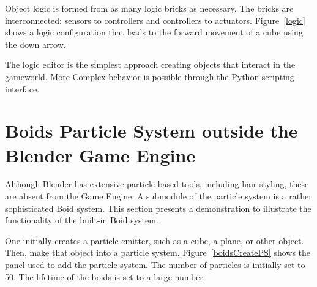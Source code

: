 Object logic is formed from as many logic bricks as necessary. The bricks are interconnected: sensors to controllers and controllers to actuators. 
Figure~\ref{logic} shows a logic configuration that leads to the forward movement of a cube using the down arrow.

The logic editor is the simplest approach creating objects that interact
in the gameworld. 
More Complex behavior is possible through the Python scripting interface.

\section{Boids Particle System outside the Blender Game Engine}
Although Blender has extensive particle-based tools, including hair styling, these are absent from the Game Engine. A submodule of the particle system is a rather sophisticated Boid system. This section presents a demonstration to illustrate the functionality of the built-in Boid system. 

One initially creates a particle emitter, such as a cube, a plane, or other object. Then, make that object into a particle system. Figure~\ref{boidsCreatePS} shows the panel used to add the particle system. The number of particles is initially set to 50. 
The lifetime of the boids is set to a large number.

